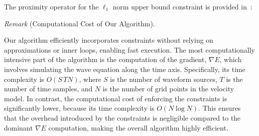 The proximity operator for the $\ell_1$ norm upper bound constraint is provided in~\cite{L1-ball-projection}:

\vspace{4mm}
\noindent \textit{Remark} (Computational Cost of Our Algorithm).
\vspace{2mm}


Our algorithm efficiently incorporates constraints without relying on approximations or inner loops, enabling fast execution.
The most computationally intensive part of the algorithm is the computation of the gradient, $\nabla E$, which involves simulating the wave equation along the time axis.
Specifically, its time complexity is $O(S\, TN)$, where $S$ is the number of waveform sources, $T$ is the number of time samples, and $N$ is the number of grid points in the velocity model.
In contrast, the computational cost of enforcing the constraints is significantly lower, because its time complexity is $O(N \log N)$.
This ensures that the overhead introduced by the constraints is negligible compared to the dominant $\nabla E$ computation, making the overall algorithm highly efficient.


